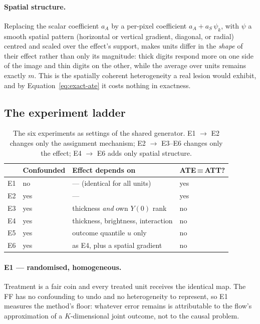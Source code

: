 \paragraph{Spatial structure.} Replacing the scalar coefficient $a_A$ by a per-pixel
coefficient $a_A + a_{S}\,\psi_k$, with $\psi$ a smooth spatial pattern (horizontal or vertical
gradient, diagonal, or radial) centred and scaled over the effect's support, makes units differ
in the \emph{shape} of their effect rather than only its magnitude: thick digits respond more
on one side of the image and thin digits on the other, while the average over units remains
exactly $m$. This is the spatially coherent heterogeneity a real lesion would exhibit, and by
Equation~\eqref{eq:exact-ate} it costs nothing in exactness.

\subsection{The experiment ladder}

\begin{table}[h]
\centering
\small
\begin{tabular}{llll}
\toprule
 & \textbf{Confounded} & \textbf{Effect depends on} & \textbf{ATE\,=\,ATT?} \\
\midrule
E1 & no  & --- (identical for all units)              & yes \\
E2 & yes & ---                                        & yes \\
E3 & yes & thickness \emph{and} own $Y(0)$ rank       & no  \\
E4 & yes & thickness, brightness, interaction         & no  \\
E5 & yes & outcome quantile $u$ only                  & no  \\
E6 & yes & as E4, plus a spatial gradient             & no  \\
\bottomrule
\end{tabular}
\caption{The six experiments as settings of the shared generator. E1 $\to$ E2 changes only the
assignment mechanism; E2 $\to$ E3--E6 changes only the effect; E4 $\to$ E6 adds only spatial
structure.}
\label{tab:ladder}
\end{table}

\paragraph{E1 --- randomised, homogeneous.} Treatment is a fair coin and every treated unit
receives the identical map. The FF has no confounding to undo and no heterogeneity to
represent, so E1 measures the method's floor: whatever error remains is attributable to the
flow's approximation of a $K$-dimensional joint outcome, not to the causal problem.


